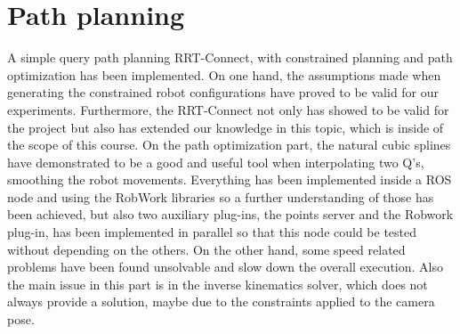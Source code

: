 \section{Path planning}
A simple query path planning RRT-Connect, with constrained planning and path optimization has been implemented.
On one hand, the assumptions made when generating the constrained robot configurations have proved to be valid for our experiments.
Furthermore, the RRT-Connect not only has showed to be valid for the project but also has extended our knowledge in this topic, which is inside of the scope of this course.
On the path optimization part, the natural cubic splines have demonstrated to be a good and useful tool when interpolating two Q's, smoothing the robot movements. Everything has been implemented inside a ROS node and using the RobWork libraries so a further understanding of those has been achieved, but also two auxiliary plug-ins, the points server and the Robwork plug-in, has been implemented in parallel so that this node could be tested without depending on the others.
On the other hand, some speed related problems have been found unsolvable and slow down the overall execution. Also the main issue in this part is in the inverse kinematics solver, which does not always provide a solution, maybe due to the constraints applied to the camera pose.

